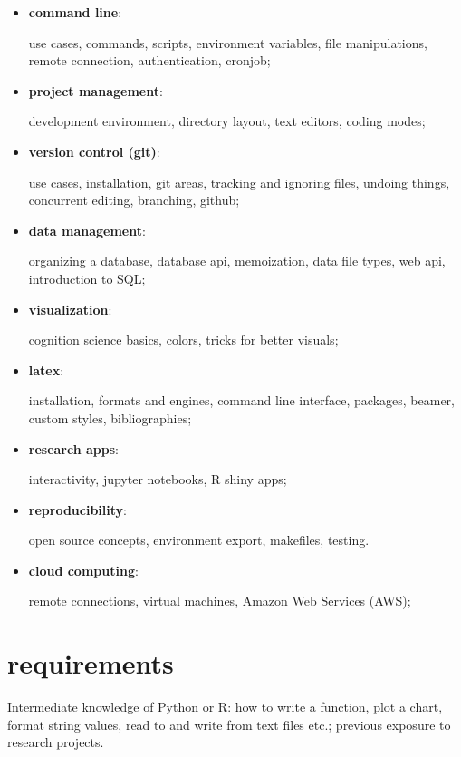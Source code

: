 \documentclass[12pt]{article}
\begin{document}
\begin{itemize}[topsep=0pt, itemsep=4pt, partopsep=0pt, parsep=0pt]
    \item \textbf{command line}:\par
        use cases, commands, scripts, environment variables, file manipulations, remote connection, authentication, cronjob;
    \item \textbf{project management}:\par
        development environment, directory layout, text editors, coding modes;
    \item \textbf{version control (git)}:\par
        use cases, installation, git areas, tracking and ignoring files, undoing things, concurrent editing, branching, github;
    \item \textbf{data management}:\par
        organizing a database, database api, memoization, data file types, web api, introduction to SQL;
        \item \textbf{visualization}:\par
        cognition science basics, colors, tricks for better visuals;
    \item \textbf{latex}:\par
        installation, formats and engines, command line interface, packages, beamer, custom styles, bibliographies;
    \item \textbf{research apps}:\par
        interactivity, jupyter notebooks, R shiny apps;
    \item \textbf{reproducibility}:\par
        open source concepts, environment export, makefiles, testing.
    \item \textbf{cloud computing}:\par
        remote connections, virtual machines, Amazon Web Services (AWS);
\end{itemize}


\section{requirements} %
\label{sec:requirements}

Intermediate knowledge of Python or R: how to write a function, plot a chart, format string values, read to and write from text files etc.; previous exposure to research projects.
\end{document}
